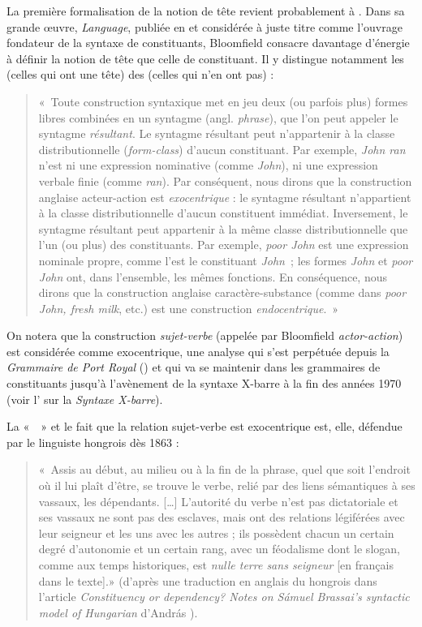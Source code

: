 {    La première formalisation de la notion de tête revient probablement à . Dans sa grande œuvre, \textit{Language}, publiée en \citeyear{bloomfield1933language} et considérée à juste titre comme l’ouvrage fondateur de la syntaxe de constituants, Bloomfield consacre davantage d’énergie à définir la notion de tête que celle de constituant. Il y distingue notamment les  (celles qui ont une tête) des  (celles qui n’en ont pas) : 
    \begin{quote}«~Toute construction syntaxique met en jeu deux (ou parfois plus) formes libres combinées en un syntagme (angl. \textit{phrase}), que l’on peut appeler le syntagme \textit{résultant}. Le syntagme résultant peut n’appartenir à la classe distributionnelle (\textit{form-class}) d’aucun constituant. Par exemple, \textit{John ran} n’est ni une expression nominative (comme \textit{John}), ni une expression verbale finie (comme \textit{ran}). Par conséquent, nous dirons que la construction anglaise acteur-action est \textit{exocentrique} : le syntagme résultant n’appartient à la classe distributionnelle d’aucun constituent immédiat. Inversement, le syntagme résultant peut appartenir à la même classe distributionnelle que l’un (ou plus) des constituants. Par exemple, \textit{poor John} est une expression nominale propre, comme l’est le constituant \textit{John~}; les formes \textit{John} et \textit{poor John} ont, dans l’ensemble, les mêmes fonctions. En conséquence, nous dirons que la construction anglaise caractère-substance (comme dans \textit{poor John, fresh milk}, etc.) est une construction \textit{endocentrique}.~» \end{quote} 
    On notera que la construction \textit{sujet-verbe} (appelée par Bloomfield \textit{actor-action}) est considérée comme exocentrique, une analyse qui s’est perpétuée depuis la \textit{Grammaire de Port Royal} (\citealt{ArnauldLancelot1660}) et qui va se maintenir dans les grammaires de constituants jusqu’à l’avènement de la syntaxe X-barre à la fin des années 1970 (voir l' sur la \textit{Syntaxe X-barre}).

    La «~~» et le fait que la relation sujet-verbe est exocentrique est, elle, défendue par le linguiste hongrois  dès 1863 : 
    \begin{quote}«~Assis au début, au milieu ou à la fin de la phrase, quel que soit l’endroit où il lui plaît d’être, se trouve le verbe, relié par des liens sémantiques à ses vassaux, les dépendants. […] L’autorité du verbe n’est pas dictatoriale et ses vassaux ne sont pas des esclaves, mais ont des relations légiférées avec leur seigneur et les uns avec les autres ; ils possèdent chacun un certain degré d’autonomie et un certain rang, avec un féodalisme dont le slogan, comme aux temps historiques, est \textit{nulle terre sans seigneur} [en français dans le texte].» (d’après une traduction en anglais du hongrois dans l’article \textit{Constituency or dependency? Notes on Sámuel Brassai’s syntactic model of Hungarian} d’András \citealt{imrenyi2013constituency}). \end{quote}

}
